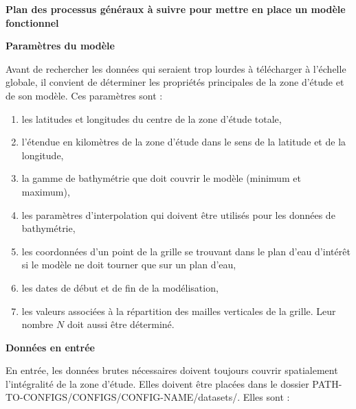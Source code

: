 \documentclass[10pt,a4paper,titlepage]{article}
\begin{document}
\begin{processEnv}{\textbf{Plan des processus généraux à suivre pour mettre en place un modèle fonctionnel}}

    {\color{paramColor}\textbf{Paramètres du modèle}}

    Avant de rechercher les données qui seraient trop lourdes à télécharger à l'échelle globale, il convient de déterminer les propriétés principales de la zone d'étude et de son modèle. Ces paramètres sont :

    \begin{enumerate}
        \item les latitudes et longitudes du centre de la zone d'étude totale,
        \item l'étendue en kilomètres de la zone d'étude dans le sens de la latitude et de la longitude,
        \item la gamme de bathymétrie que doit couvrir le modèle (minimum et maximum),
        \item les paramètres d'interpolation qui doivent être utilisés pour les données de bathymétrie,
        \item les coordonnées d'un point de la grille se trouvant dans le plan d'eau d'intérêt si le modèle ne doit tourner que sur un plan d'eau,
        \item les dates de début et de fin de la modélisation,
        \item les valeurs associées à la répartition des mailles verticales de la grille. Leur nombre $N$ doit aussi être déterminé.
    \end{enumerate}


    {\color{dataColor}\textbf{Données en entrée}}

    En entrée, les données brutes nécessaires doivent toujours couvrir spatialement l'intégralité de la zone d'étude. Elles doivent être placées dans le dossier PATH-TO-CONFIGS/CONFIGS/CONFIG-NAME/datasets/.
    Elles sont :


\end{processEnv}
\end{document}
